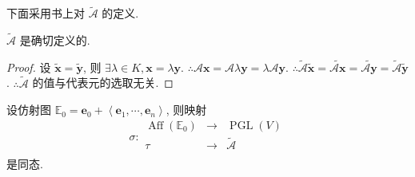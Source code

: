 \documentclass{ctexart}
\begin{document}
下面采用书上对 $\widetilde{\mathcal{A}}$ 的定义.
\begin{theorem}
    $\widetilde{\mathcal{A}}$ 是确切定义的.
\end{theorem}
\begin{proof}
    设 $\tilde{\boldsymbol{x}}=\tilde{\boldsymbol{y}}$, 则 $\exists\lambda\in K,\boldsymbol{x}=\lambda\boldsymbol{y}$. $\therefore\mathcal{A}\boldsymbol{x}=\mathcal{A}\lambda\boldsymbol{y}=\lambda\mathcal{A}\boldsymbol{y}$. $\therefore\widetilde{\mathcal{A}}\tilde{\boldsymbol{x}}=\widetilde{\mathcal{A}\boldsymbol{x}}=\widetilde{\mathcal{A}\boldsymbol{y}}=\widetilde{\mathcal{A}}\tilde{\boldsymbol{y}}$. $\therefore\widetilde{\mathcal{A}}$ 的值与代表元的选取无关.
\end{proof}
\begin{theorem}
    设仿射图 $\mathbb{E}_0=\boldsymbol{e}_0+\left<\boldsymbol{e}_1,\cdots,\boldsymbol{e}_n\right>$, 则映射
    \[\sigma:\begin{array}{rcl}
        \operatorname{Aff}(\mathbb{E}_0) & \to & \operatorname{PGL}(V) \\
        \tau & \to & \widetilde{\mathcal{A}} \\
    \end{array}\]
    是同态.
\end{theorem}
\end{document}
